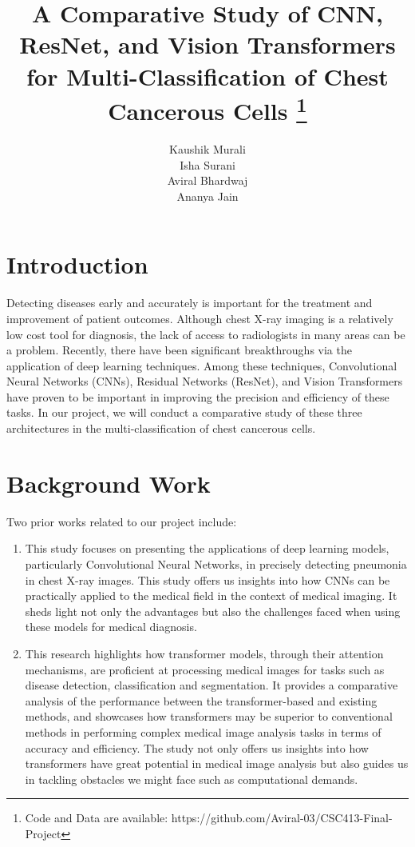 \documentclass{article}
\title{A Comparative Study of CNN, ResNet, and Vision Transformers for Multi-Classification of Chest Cancerous Cells \thanks{Code and Data are available: https://github.com/Aviral-03/CSC413-Final-Project}}
\author{
    Kaushik Murali \\
    \And
    Isha Surani \\
    \And
    Aviral Bhardwaj \\
    \And
    Ananya Jain \\
}
\begin{document}
\maketitle
\section{Introduction}

Detecting diseases early and accurately is important for the treatment and improvement of patient outcomes. Although chest X-ray imaging is a relatively low cost tool for diagnosis, the lack of access to radiologists in many areas can be a problem. Recently, there have been significant breakthroughs via the application of deep learning techniques. Among these techniques, Convolutional Neural Networks (CNNs), Residual Networks (ResNet), and Vision Transformers have proven to be important in improving the precision and efficiency of these tasks. In our project, we will conduct a comparative study of these three architectures in the multi-classification of chest cancerous cells.

\section{Background Work}


Two prior works related to our project include: 
\begin{enumerate}
    \item \textbf{\citet{kermany2018identifying}}
This study focuses on presenting the applications of deep learning models, particularly Convolutional Neural Networks, in precisely detecting pneumonia in chest X-ray images. This study offers us insights into how CNNs can be practically applied to the medical field in the context of medical imaging. It sheds light not only the advantages but also the challenges faced when using these models for medical diagnosis.

    \item \textbf{\citet{liu2023recent}}
This research highlights how transformer models, through their attention mechanisms, are proficient at processing medical images for tasks such as disease detection, classification and segmentation. It provides a comparative analysis of the performance between the transformer-based and existing methods, and showcases how transformers may be superior to conventional methods in performing complex medical image analysis tasks in terms of accuracy and efficiency. The study not only offers us insights into how transformers have great potential in medical image analysis but also guides us in tackling obstacles we might face such as computational demands.
\end{enumerate}
\end{document}
